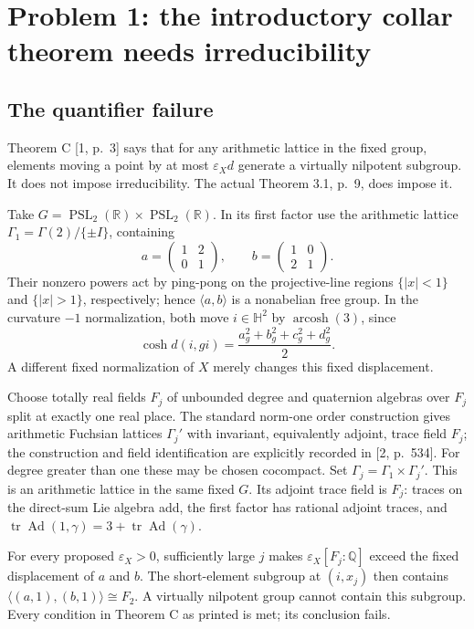 \documentclass[10pt]{article}
\begin{document}
\section*{Problem 1: the introductory collar theorem needs irreducibility}
\subsection*{The quantifier failure}
Theorem C [1, p. 3] says that for any arithmetic lattice in the fixed group, elements moving a point by at most \(\varepsilon_X d\) generate a virtually nilpotent subgroup. It does not impose irreducibility. The actual Theorem 3.1, p. 9, does impose it.\par
Take \(G=\operatorname{PSL}_2(\mathbb R)\times\operatorname{PSL}_2(\mathbb R)\). In its first factor use the arithmetic lattice \(\Gamma_1=\Gamma(2)/\{\pm I\}\), containing \[a=\begin{pmatrix}1&2\\0&1\end{pmatrix},
 \qquad b=\begin{pmatrix}1&0\\2&1\end{pmatrix}.\] Their nonzero powers act by ping-pong on the projective-line regions \(\{|x|<1\}\) and \(\{|x|>1\}\), respectively; hence \(\langle a,b\rangle\) is a nonabelian free group. In the curvature \(-1\) normalization, both move \(i\in\mathbb H^2\) by \(\operatorname{arcosh}(3)\), since \[\cosh d(i,gi)=\frac{a_g^2+b_g^2+c_g^2+d_g^2}{2}.\] A different fixed normalization of \(X\) merely changes this fixed displacement.\par
Choose totally real fields \(F_j\) of unbounded degree and quaternion algebras over \(F_j\) split at exactly one real place. The standard norm-one order construction gives arithmetic Fuchsian lattices \(\Gamma_j'\) with invariant, equivalently adjoint, trace field \(F_j\); the construction and field identification are explicitly recorded in [2, p. 534]. For degree greater than one these may be chosen cocompact. Set \(\Gamma_j=\Gamma_1\times\Gamma_j'\). This is an arithmetic lattice in the same fixed \(G\). Its adjoint trace field is \(F_j\): traces on the direct-sum Lie algebra add, the first factor has rational adjoint traces, and \(\operatorname{tr}\operatorname{Ad}(1,\gamma)=3+\operatorname{tr}\operatorname{Ad}(\gamma)\).\par
For every proposed \(\varepsilon_X>0\), sufficiently large \(j\) makes \(\varepsilon_X[F_j:\mathbb Q]\) exceed the fixed displacement of \(a\) and \(b\). The short-element subgroup at \((i,x_j)\) then contains \(\langle(a,1),(b,1)\rangle\cong F_2\). A virtually nilpotent group cannot contain this subgroup. Every condition in Theorem C as printed is met; its conclusion fails.\par
\end{document}
